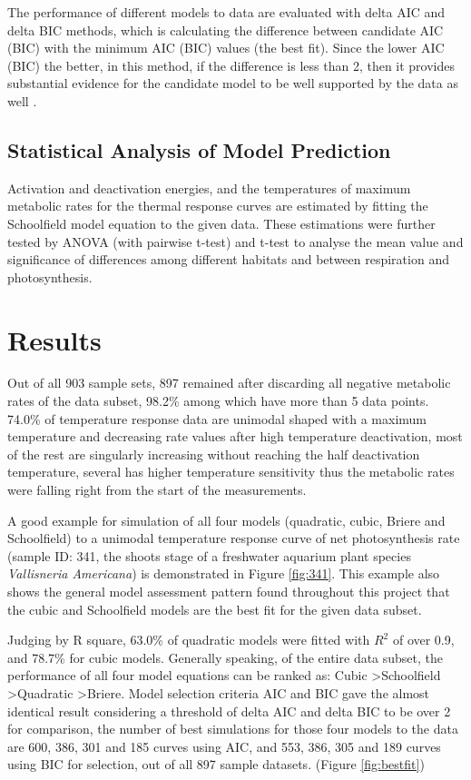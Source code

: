 \documentclass[11pt, a4paper]{article}
\begin{document}
\begin{spacing}{1.5}
The performance of different models to data are evaluated with delta AIC and delta BIC methods, which is calculating the difference between candidate AIC (BIC) with the minimum AIC (BIC) values (the best fit). Since the lower AIC (BIC) the better, in this method, if the difference is less than 2, then it provides substantial evidence for the candidate model to be well supported by the data as well \citep{burnham2002practical, raftery1995bayesian}. 

\subsection{Statistical Analysis of Model Prediction}

Activation and deactivation energies, and the temperatures of maximum metabolic rates for the thermal response curves are estimated by fitting the Schoolfield model equation to the given data. These estimations were further tested by ANOVA (with pairwise t-test) and t-test to analyse the mean value and significance of differences among different habitats and between respiration and photosynthesis. 

\section{Results}

Out of all 903 sample sets, 897 remained after discarding all negative metabolic rates of the data subset, 98.2\% among which have more than 5 data points. 74.0\% of temperature response data are unimodal shaped with a maximum temperature and decreasing rate values after high temperature deactivation, most of the rest are singularly increasing without reaching the half deactivation temperature, several has higher temperature sensitivity thus the metabolic rates were falling right from the start of the measurements. 

A good example for simulation of all four models (quadratic, cubic, Briere and Schoolfield) to a unimodal temperature response curve of net photosynthesis rate (sample ID: 341, the shoots stage of a freshwater aquarium plant species \textit{Vallisneria Americana}) is demonstrated in Figure \ref{fig:341}. This example also shows the general model assessment pattern found throughout this project that the cubic and Schoolfield models are the best fit for the given data subset. 

Judging by R square, 63.0\% of quadratic models were fitted with $R^2$ of over 0.9, and 78.7\% for cubic models. Generally speaking, of the entire data subset, the performance of all four model equations can be ranked as: Cubic \textgreater Schoolfield \textgreater Quadratic \textgreater Briere. Model selection criteria AIC and BIC gave the almost identical result considering a threshold of delta AIC and delta BIC to be over 2 for comparison, the number of best simulations for those four models to the data are 600, 386, 301 and 185 curves using AIC, and 553, 386, 305 and 189 curves using BIC for selection, out of all 897 sample datasets. (Figure \ref{fig:bestfit}) 


\end{spacing}
\end{document}
